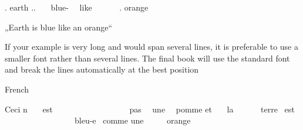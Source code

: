 \begin{styleLangSciIMT}
. earth .. \ \ \ blue- \ \ like \ \ \ \ \ \ . orange
\end{styleLangSciIMT}

\begin{styleLangSciTranslation}
„Earth is blue like an orange“
\end{styleLangSciTranslation}

\begin{styleStandard}
If your example is very long and would span several lines, it is preferable to use a smaller font rather than several lines. The final book will use the standard font and break the lines automatically at the best position
\end{styleStandard}

\begin{listLangSciLanginfoiileveli}
\item 
\begin{styleLangSciLanginfo}
French
\end{styleLangSciLanginfo}
\end{listLangSciLanginfoiileveli}
\begin{styleLangSciExample}
Ceci n{\textquotesingle} \ \ \ est \ \ \ \ \ \ \ \ \ \ \ \ \ \ \ \ \ \ pas \ \ une \ \ pomme et \ \ \ la \ \ \ \ \ \ terre \ est \ \ \ \ \ \ \ \ \ \ \ \ \ \ \ \ \ bleu-e \ comme une \ \ \ \ \ orange
\end{styleLangSciExample}


\begin{styleLangSciIMT}
\textstyleAbsatzStandardschriftart{ \ }
\end{styleLangSciIMT}

